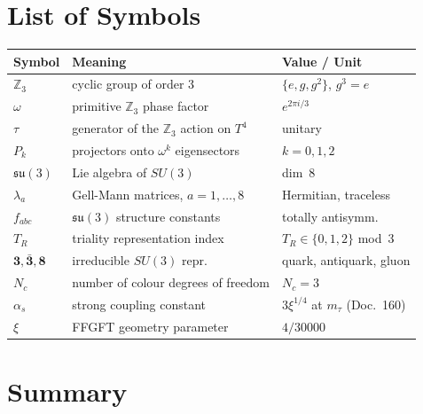 
\section*{List of Symbols}

\begin{center}
\begin{tabular}{lll}
\toprule
Symbol & Meaning & Value / Unit \\
\midrule
$\mathbb{Z}_3$ & cyclic group of order 3 & $\{e,g,g^2\}$, $g^3=e$ \\
$\omega$ & primitive $\mathbb{Z}_3$ phase factor & $e^{2\pi i/3}$ \\
$\tau$ & generator of the $\mathbb{Z}_3$ action on $T^4$ & unitary \\
$P_k$ & projectors onto $\omega^k$ eigensectors & $k=0,1,2$ \\
$\mathfrak{su}(3)$ & Lie algebra of $SU(3)$ & dim~8 \\
$\lambda_a$ & Gell-Mann matrices, $a=1,\ldots,8$ & Hermitian, traceless \\
$f_{abc}$ & $\mathfrak{su}(3)$ structure constants & totally antisymm. \\
$T_R$ & triality representation index & $T_R \in \{0,1,2\}$ mod~3 \\
$\mathbf{3}, \bar{\mathbf{3}}, \mathbf{8}$ & irreducible $SU(3)$ repr. & quark, antiquark, gluon \\
$N_c$ & number of colour degrees of freedom & $N_c = 3$ \\
$\alpha_s$ & strong coupling constant & $3\xi^{1/4}$ at $m_\tau$ (Doc.~160) \\
$\xi$ & FFGFT geometry parameter & $4/30000$ \\
\bottomrule
\end{tabular}
\end{center}



\section*{Summary}


